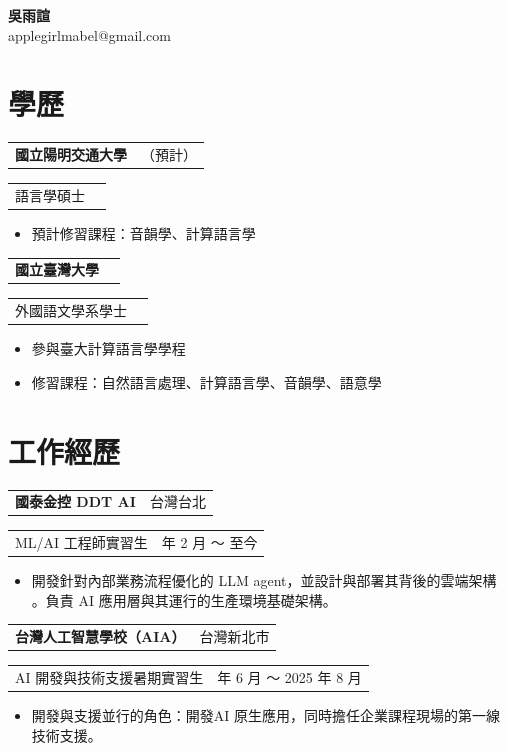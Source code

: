 \documentclass[11pt,a4paper]{article}
\makeatletter
\newcommand{\entryhead}[2]{%
  \begin{tabularx}{\linewidth}{@{}Xr@{}}
    \textbf{\fontsize{10.5pt}{13pt}\selectfont #1} &
    {\color{inkmuted}\fontsize{9.5pt}{12pt}\selectfont #2}
  \end{tabularx}%
}
\newcommand{\entrysub}[2]{%
  \begin{tabularx}{\linewidth}{@{}Xr@{}}
    {\color{inkmuted}\fontsize{9.5pt}{12pt}\selectfont #1} &
    {\color{inkmuted}\fontsize{9.5pt}{12pt}\selectfont #2}
  \end{tabularx}%
}
\makeatother
\begin{document}
\begin{center}
  {\sffamily\bfseries\fontsize{17pt}{20pt}\selectfont
   吳雨諠}\\[1.2mm]
  {\color{inkmuted}\fontsize{9pt}{11pt}\selectfont
   applegirlmabel@gmail.com}
\end{center}

\section{學歷}
\entryhead{國立陽明交通大學}{2028（預計）}
\entrysub{語言學碩士}{}
\begin{itemize}
  \item 預計修習課程：音韻學、計算語言學
\end{itemize}
\vspace{2.6mm}\entryhead{國立臺灣大學}{2026}
\entrysub{外國語文學系學士}{}
\begin{itemize}
  \item 參與臺大計算語言學學程
  \item 修習課程：自然語言處理、計算語言學、音韻學、語意學
\end{itemize}

\section{工作經歷}
\entryhead{國泰金控 DDT AI}{台灣台北}
\entrysub{ML/AI 工程師實習生}{2026 年 2 月 ～ 至今}
\begin{itemize}
  \item 開發針對內部業務流程優化的 LLM agent，並設計與部署其背後的雲端架構 。負責 AI 應用層與其運行的生產環境基礎架構。
\end{itemize}
\vspace{2.6mm}\entryhead{台灣人工智慧學校（AIA）}{台灣新北市}
\entrysub{AI 開發與技術支援暑期實習生}{2025 年 6 月 ～ 2025 年 8 月}
\begin{itemize}
  \item 開發與支援並行的角色：開發AI 原生應用，同時擔任企業課程現場的第一線技術支援。
\end{itemize}
\end{document}

